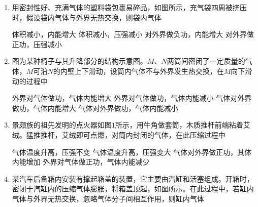 \begin{enumerate}[leftmargin=0em]
\renewcommand{\labelenumi}{\arabic{enumi}.}
\item
{}
用密封性好、充满气体的塑料袋包裹易碎品，如图所示，充气袋四周被挤压时，假设袋内气体与外界无热交换，则袋内气体  
\begin{figure}[h!]
\centering

\end{figure}

\fourchoices
{体积减小，内能增大}
{体积减小，压强减小}
{对外界做负功，内能增大}
{对外界做正功，压强减小}


\item 
{}
图为某种椅子与其升降部分的结构示意图。$ M $、$ N $两筒间密闭了一定质量的气体，$ M $可沿$ N $的内壁上下滑动，设筒内气体不与外界发生热交换，在$ M $向下滑动的过程中  
\begin{figure}[h!]
\centering

\end{figure}

\fourchoices
{外界对气体做功，气体内能增大}
{外界对气体做功，气体内能减小}
{气体对外界做功，气体内能增大}
{气体对外界做功，气体内能减小}


\item 
{}
景颇族的祖先发明的点火器如图$ 1 $所示，用牛角做套筒，木质推杆前端粘着艾绒。猛推推杆，艾绒即可点燃，对筒内封闭的气体，在此压缩过程中  
\begin{figure}[h!]
\centering

\end{figure}


\fourchoices
{气体温度升高，压强不变}
{气体温度升高，压强变大}
{气体对外界做正功，其体内能增加}
{外界对气体做正功，气体内能减少}


\item 
{}
某汽车后备箱内安装有撑起箱盖的装置，它主要由汽缸和活塞组成。开箱时，密闭于汽缸内的压缩气体膨胀，将箱盖顶起，如图所示。在此过程中，若缸内气体与外界无热交换，忽略气体分子间相互作用，则缸内气体  
\begin{figure}[h!]
\centering

\end{figure}


\end{enumerate}
